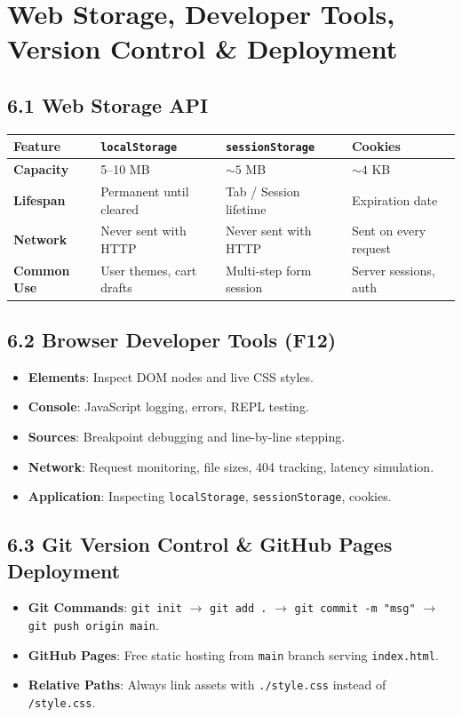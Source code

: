 \chapter{Web Storage, Developer Tools, Version Control \& Deployment}

\section{6.1 Web Storage API}
\begin{center}
\begin{tabularx}{\textwidth}{l X X X}
\toprule
\textbf{Feature} & \textbf{\texttt{localStorage}} & \textbf{\texttt{sessionStorage}} & \textbf{Cookies} \\
\midrule
\textbf{Capacity} & 5--10 MB & $\sim 5$ MB & $\sim 4$ KB \\
\textbf{Lifespan} & Permanent until cleared & Tab / Session lifetime & Expiration date \\
\textbf{Network} & Never sent with HTTP & Never sent with HTTP & Sent on every request \\
\textbf{Common Use} & User themes, cart drafts & Multi-step form session & Server sessions, auth \\
\bottomrule
\end{tabularx}
\end{center}

\section{6.2 Browser Developer Tools (F12)}
\begin{itemize}[leftmargin=*]
    \item \textbf{Elements}: Inspect DOM nodes and live CSS styles.
    \item \textbf{Console}: JavaScript logging, errors, REPL testing.
    \item \textbf{Sources}: Breakpoint debugging and line-by-line stepping.
    \item \textbf{Network}: Request monitoring, file sizes, 404 tracking, latency simulation.
    \item \textbf{Application}: Inspecting \texttt{localStorage}, \texttt{sessionStorage}, cookies.
\end{itemize}

\section{6.3 Git Version Control \& GitHub Pages Deployment}
\begin{itemize}[leftmargin=*]
    \item \textbf{Git Commands}: \texttt{git init} $\to$ \texttt{git add .} $\to$ \texttt{git commit -m "msg"} $\to$ \texttt{git push origin main}.
    \item \textbf{GitHub Pages}: Free static hosting from \texttt{main} branch serving \texttt{index.html}.
    \item \textbf{Relative Paths}: Always link assets with \texttt{./style.css} instead of \texttt{/style.css}.
\end{itemize}
